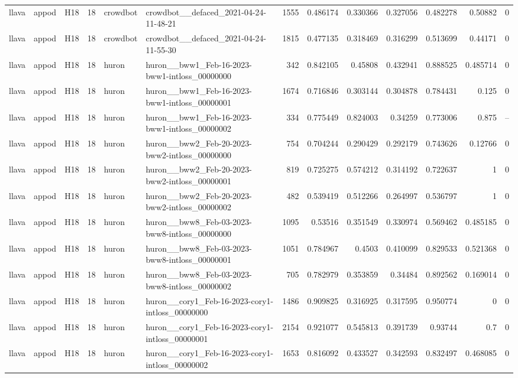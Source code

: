 \begin{longtable}{lllrllrrrrrrr}
llava & appod & H18 & 18 & crowdbot & crowdbot\_\_defaced\_2021-04-24-11-48-21 & 1555 & 0.486174 & 0.330366 & 0.327056 & 0.482278 & 0.50882 & 0 \\
llava & appod & H18 & 18 & crowdbot & crowdbot\_\_defaced\_2021-04-24-11-55-30 & 1815 & 0.477135 & 0.318469 & 0.316299 & 0.513699 & 0.44171 & 0 \\
llava & appod & H18 & 18 & huron & huron\_\_bww1\_Feb-16-2023-bww1-intloss\_00000000 & 342 & 0.842105 & 0.45808 & 0.432941 & 0.888525 & 0.485714 & 0 \\
llava & appod & H18 & 18 & huron & huron\_\_bww1\_Feb-16-2023-bww1-intloss\_00000001 & 1674 & 0.716846 & 0.303144 & 0.304878 & 0.784431 & 0.125 & 0 \\
llava & appod & H18 & 18 & huron & huron\_\_bww1\_Feb-16-2023-bww1-intloss\_00000002 & 334 & 0.775449 & 0.824003 & 0.34259 & 0.773006 & 0.875 & -- \\
llava & appod & H18 & 18 & huron & huron\_\_bww2\_Feb-20-2023-bww2-intloss\_00000000 & 754 & 0.704244 & 0.290429 & 0.292179 & 0.743626 & 0.12766 & 0 \\
llava & appod & H18 & 18 & huron & huron\_\_bww2\_Feb-20-2023-bww2-intloss\_00000001 & 819 & 0.725275 & 0.574212 & 0.314192 & 0.722637 & 1 & 0 \\
llava & appod & H18 & 18 & huron & huron\_\_bww2\_Feb-20-2023-bww2-intloss\_00000002 & 482 & 0.539419 & 0.512266 & 0.264997 & 0.536797 & 1 & 0 \\
llava & appod & H18 & 18 & huron & huron\_\_bww8\_Feb-03-2023-bww8-intloss\_00000000 & 1095 & 0.53516 & 0.351549 & 0.330974 & 0.569462 & 0.485185 & 0 \\
llava & appod & H18 & 18 & huron & huron\_\_bww8\_Feb-03-2023-bww8-intloss\_00000001 & 1051 & 0.784967 & 0.4503 & 0.410099 & 0.829533 & 0.521368 & 0 \\
llava & appod & H18 & 18 & huron & huron\_\_bww8\_Feb-03-2023-bww8-intloss\_00000002 & 705 & 0.782979 & 0.353859 & 0.34484 & 0.892562 & 0.169014 & 0 \\
llava & appod & H18 & 18 & huron & huron\_\_cory1\_Feb-16-2023-cory1-intloss\_00000000 & 1486 & 0.909825 & 0.316925 & 0.317595 & 0.950774 & 0 & 0 \\
llava & appod & H18 & 18 & huron & huron\_\_cory1\_Feb-16-2023-cory1-intloss\_00000001 & 2154 & 0.921077 & 0.545813 & 0.391739 & 0.93744 & 0.7 & 0 \\
llava & appod & H18 & 18 & huron & huron\_\_cory1\_Feb-16-2023-cory1-intloss\_00000002 & 1653 & 0.816092 & 0.433527 & 0.342593 & 0.832497 & 0.468085 & 0 \\

\end{longtable}
